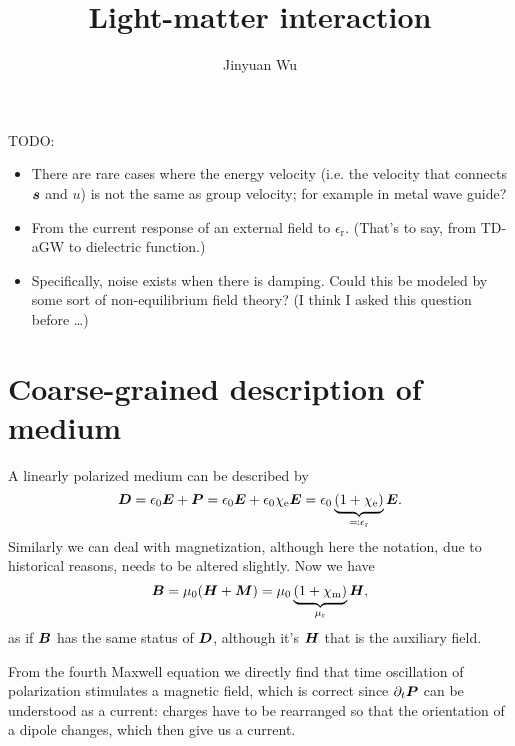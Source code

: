 \documentclass[hyperref, a4paper]{article}
\title{Light-matter interaction}
\author{Jinyuan Wu}
\newcommand{\epsr}{\epsilon_{\text{r}}}
\begin{document}
\maketitle

TODO:
\begin{itemize}
    \item There are rare cases where the energy velocity 
    (i.e. the velocity that connects $\vb*{s}$ and $u$) 
    is not the same as group velocity;
    for example in metal wave guide?
    \item From the current response of an external field to $\epsr$.
    (That's to say, 
    from TD-aGW to dielectric function.)
    \item Specifically, noise exists when there is damping. 
    Could this be modeled by some sort of non-equilibrium field theory?
    (I think I asked this question before \dots)
\end{itemize}

\section{Coarse-grained description of medium}

A linearly polarized medium can be described by 
\begin{equation}
    \vb*{D} = \epsilon_0 \vb*{E} + \vb*{P}
    = \epsilon_0 \vb*{E} + \epsilon_0 \chi_{\text{e}} \vb*{E} 
    = \epsilon_0 \underbrace{(1 + \chi_\text{e})}_{\eqqcolon \epsilon_{\text{r}}} \vb*{E}.
\end{equation}
Similarly we can deal with magnetization, 
although here the notation, due to historical reasons, needs to be altered slightly.
Now we have 
\begin{equation}
    \vb*{B} = \mu_0 (\vb*{H} + \vb*{M})
    = \mu_0 \underbrace{(1 + \chi_{\text{m}})}_{\mu_{\text{r}}} \vb*{H},
\end{equation}
as if $\vb*{B}$ has the same status of $\vb*{D}$,
although it's $\vb*{H}$ that is the auxiliary field.

From the fourth Maxwell equation we directly find
that time oscillation of polarization stimulates a magnetic field, 
which is correct since $\partial_t \vb*{P}$
can be understood as a current: 
charges have to be rearranged 
so that the orientation of a dipole changes,
which then give us a current.
\end{document}
